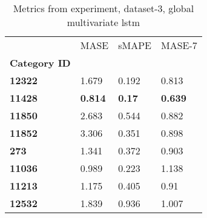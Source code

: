 \begin{table}[H]
\centering
\caption{Metrics from experiment, dataset-3, global multivariate lstm}
\label{table:global-multivariate-lstm-dataset-3}
\begin{tabular}{llll}
\toprule
{} &            MASE &          sMAPE &          MASE-7 \\
\textbf{Category ID} &                 &                &                 \\
\midrule
\textbf{12322      } &           1.679 &          0.192 &           0.813 \\
\textbf{11428      } &  \textbf{0.814} &  \textbf{0.17} &  \textbf{0.639} \\
\textbf{11850      } &           2.683 &          0.544 &           0.882 \\
\textbf{11852      } &           3.306 &          0.351 &           0.898 \\
\textbf{273        } &           1.341 &          0.372 &           0.903 \\
\textbf{11036      } &           0.989 &          0.223 &           1.138 \\
\textbf{11213      } &           1.175 &          0.405 &            0.91 \\
\textbf{12532      } &           1.839 &          0.936 &           1.007 \\
\bottomrule
\end{tabular}
\end{table}
